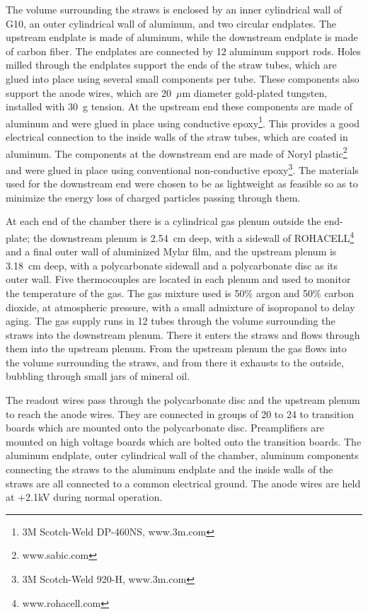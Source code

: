 The volume surrounding the straws is enclosed by an inner cylindrical wall of G10, an outer cylindrical wall of aluminum, and two circular endplates. 
The upstream endplate is made of aluminum, while the downstream endplate is made of carbon fiber. The endplates are connected by 12 aluminum support rods. 
Holes milled through the endplates support the ends of the straw tubes, which are glued into place using several small components per tube.  
These components also support the anode wires, which are 20~$\mu$m diameter gold-plated tungsten, installed with 30~g tension.
At the upstream end these components are made of aluminum and were glued in place using conductive epoxy\footnote{3M Scotch-Weld DP-460NS, www.3m.com}. 
This provides a good electrical connection to the inside walls of the straw tubes, which are coated in aluminum.
The components at the downstream end are made of Noryl plastic\footnote{www.sabic.com} and were glued in place using conventional non-conductive epoxy\footnote{3M Scotch-Weld 920-H, www.3m.com}.
The materials used for the downstream end were chosen to be as lightweight as feasible so as to minimize the energy loss of charged particles passing through them. 

At each end of the chamber there is a cylindrical gas plenum outside the end-plate; the downstream plenum is 2.54~cm deep, with a sidewall of ROHACELL\footnote{www.rohacell.com} and a final outer wall of aluminized Mylar film, and the upstream plenum is 3.18~cm deep, with a polycarbonate sidewall and a polycarbonate disc as its outer wall. 
Five thermocouples are located in each plenum and used to monitor the temperature of the gas.
The gas mixture used is 50$\%$ argon and 50$\%$ carbon dioxide, at atmospheric pressure, with a small admixture of isopropanol to delay aging.
The gas supply runs in 12 tubes through the volume surrounding the straws into the downstream plenum. 
There it enters the straws and flows through them into the upstream plenum. From the upstream plenum the gas flows into the volume surrounding the straws, and from there it exhausts to the outside, bubbling through small jars of mineral oil.

The readout wires pass through the polycarbonate disc and the upstream plenum to reach the anode wires. 
They are connected in groups of 20 to 24 to transition boards which are mounted onto the polycarbonate disc. 
Preamplifiers\cite{hdnote2515} are mounted on high voltage boards which are bolted onto the transition boards. The aluminum endplate, outer cylindrical wall of the chamber, aluminum components connecting the straws to the aluminum endplate and the inside walls of the straws are all connected to a common electrical ground. 
The anode wires are held at +2.1kV during normal operation. 

